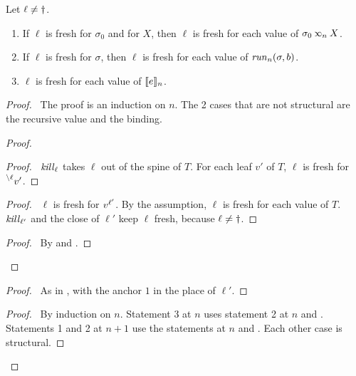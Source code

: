 \begin{lem}\label{lem:fresh}
  Let $\ell\neq\dead$.
  \begin{enumerate}
    \item If $\ell$ is fresh for $\sigma_0$ and for $X$, then $\ell$ is fresh for each value of $\sigma_0\lk{n}X$.
    \item If $\ell$ is fresh for $\sigma$, then $\ell$ is fresh for each value of $\runb{n}(\sigma,b)$.
    \item $\ell$ is fresh for each value of $\den{e}{n}$.
  \end{enumerate}
\end{lem}
\begin{proof}
  \pfsketch\ The proof is an induction on $n$.
  The 2 cases that are not structural are the recursive value and the binding.
  \begin{proof}
    \begin{proof}
      \pf\ $\killf{\ell}$ takes $\ell$ out of the spine of $T$.
      For each leaf $v'$ of $T$, $\ell$ is fresh for $\closeloc{\ell}{v'}$.
    \end{proof}
    \begin{proof}
      \pf\ $\ell$ is fresh for $\openloc{\ell'}{v}$.
      By the assumption, $\ell$ is fresh for each value of $T$.
      $\killf{\ell'}$ and the close of $\ell'$ keep $\ell$ fresh, because $\ell\neq\dead$.
    \end{proof}
    \qedstep
    \begin{proof}
      \pf\ By  and .
    \end{proof}
  \end{proof}
  \begin{proof}
    \pf\ As in , with the anchor $1$ in the place of $\ell'$.
  \end{proof}
  \qedstep
  \begin{proof}
    \pf\ By induction on $n$.
    Statement 3 at $n$ uses statement 2 at $n$ and .
    Statements 1 and 2 at $n+1$ use the statements at $n$ and .
    Each other case is structural.
  \end{proof}
\end{proof}

